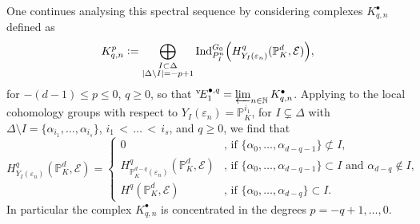 \documentclass[a4paper, reqno, 10pt]{amsart}
\theoremstyle{definition}
\numberwithin{equation}{section}
\newcommand{\abs}[1]{{\lvert{#1}\rvert}}
\newcommand{\defeq}{\vcentcolon=}
\newcommand{\eqdef}{=\vcentcolon}
\newcommand{\Ind}{{\mathrm{Ind}}}
\newcommand{\nsubset}{{\not\subset}}
\newcommand{\BN}{{\mathbb {N}}}
\newcommand{\BP}{{\mathbb {P}}}
\newcommand{\CE}{{\mathcal {E}}}
\begin{document}
One continues analysing this spectral sequence by considering complexes $K^\bullet_{q,n}$ defined as
\begin{equation*}
	K^p_{q,n} \defeq \bigoplus\limits_{\substack{I\subset \Delta \\ \abs{\Delta\setminus I}=-p+1}} \Ind^{G_0}_{P_I^n} \Big( H^q_{Y_I(\varepsilon_n)} (\BP_K^d, \CE) \Big) ,
\end{equation*}
for $-(d-1)\leq p\leq 0$, $q \geq 0$, so that $^{\rm v}\! E_1^{\bullet,q} = \varprojlim_{n\in \BN} K^\bullet_{q,n}$.
Applying  to the local cohomology groups with respect to $Y_I(\varepsilon_n) = \BP_K^{i_1}$, for $I \subsetneq \Delta$ with $\Delta\setminus I = \{\alpha_{i_1},\ldots,\alpha_{i_s} \}$, $i_1{\,<\,}\ldots{\,<\,}i_s$, and $q \geq 0$, we find that
\begin{equation*}
	H^q_{ Y_I(\varepsilon_n)} (\BP_K^d, \CE) = \begin{cases}
		0 & \text{, if $\{\alpha_0,\ldots,\alpha_{d-q-1}\} \nsubset I$,} \\
		H^q_{ \BP_K^{d-q}(\varepsilon_n)} (\BP_K^d, \CE) & \text{, if $\{\alpha_0,\ldots,\alpha_{d-q-1}\}\subset I$ and $\alpha_{d-q}\notin I$,} \\
		H^q (\BP_K^d, \CE) & \text{, if $\{\alpha_0,\ldots,\alpha_{d-q} \} \subset I$.} 
	\end{cases}
\end{equation*}
In particular the complex $K^\bullet_{q,n}$ is concentrated in the degrees $p=-q+1,\ldots, 0$.
\end{document}
